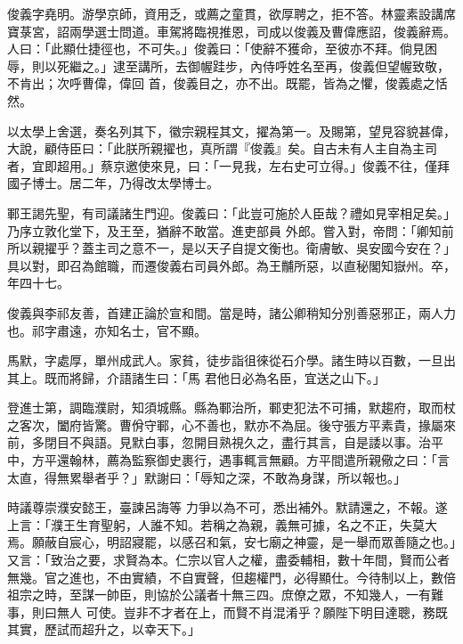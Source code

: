 \begin{pinyinscope}
 俊義字堯明。游學京師，資用乏，或薦之童貫，欲厚聘之，拒不答。林靈素設講席寶菉宮，詔兩學選士問道。車駕將臨視推恩，司成以俊義及曹偉應詔，俊義辭焉。人曰：「此顯仕捷徑也，不可失。」俊義曰：「使辭不獲命，至彼亦不拜。倘見困辱，則以死繼之。」逮至講所，去御幄跬步，內侍呼姓名至再，俊義但望幄致敬，不肯出；次呼曹偉，偉回
 首，俊義目之，亦不出。既罷，皆為之懼，俊義處之恬然。



 以太學上舍選，奏名列其下，徽宗親程其文，擢為第一。及賜第，望見容貌甚偉，大說，顧侍臣曰：「此朕所親擢也，真所謂『俊義』矣。自古未有人主自為主司者，宜即超用。」蔡京邀使來見，曰：「一見我，左右史可立得。」俊義不往，僅拜國子博士。居二年，乃得改太學博士。



 鄆王謁先聖，有司議諸生門迎。俊義曰：「此豈可施於人臣哉？禮如見宰相足矣。」乃序立敦化堂下，及王至，猶辭不敢當。進吏部員
 外郎。嘗入對，帝問：「卿知前所以親擢乎？蓋主司之意不一，是以天子自提文衡也。衛膚敏、吳安國今安在？」具以對，即召為館職，而遷俊義右司員外郎。為王黼所惡，以直秘閣知嶽州。卒，年四十七。



 俊義與李祁友善，首建正論於宣和間。當是時，諸公卿稍知分別善惡邪正，兩人力也。祁字肅遠，亦知名士，官不顯。



 馬默，字處厚，單州成武人。家貧，徒步詣徂徠從石介學。諸生時以百數，一旦出其上。既而將歸，介語諸生曰：「馬
 君他日必為名臣，宜送之山下。」



 登進士第，調臨濮尉，知須城縣。縣為鄆治所，鄆吏犯法不可捕，默趨府，取而杖之客次，闔府皆驚。曹佾守鄆，心不善也，默亦不為屈。後守張方平素貴，掾屬來前，多閉目不與語。見默白事，忽開目熟視久之，盡行其言，自是諉以事。治平中，方平還翰林，薦為監察御史裹行，遇事輒言無顧。方平間遣所親儆之曰：「言太直，得無累舉者乎？」默謝曰：「辱知之深，不敢為身謀，所以報也。」



 時議尊崇濮安懿王，臺諫呂誨等
 力爭以為不可，悉出補外。默請還之，不報。遂上言：「濮王生育聖躬，人誰不知。若稱之為親，義無可據，名之不正，失莫大焉。願蔽自宸心，明詔寢罷，以感召和氣，安七廟之神靈，是一舉而眾善隨之也。」又言：「致治之要，求賢為本。仁宗以官人之權，盡委輔相，數十年間，賢而公者無幾。官之進也，不由實績，不自實聲，但趨權門，必得顯仕。今待制以上，數倍祖宗之時，至謀一帥臣，則協於公議者十無三四。庶僚之眾，不知幾人，一有難事，則曰無人
 可使。豈非不才者在上，而賢不肖混淆乎？願陛下明目達聰，務既其實，歷試而超升之，以幸天下。」




\end{pinyinscope}
